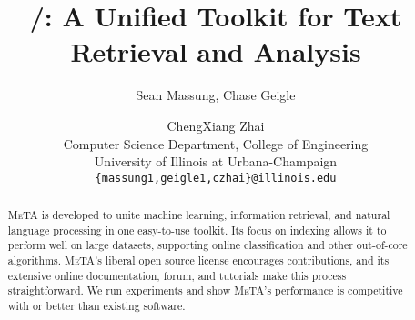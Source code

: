 \documentclass[11pt]{article}
\title{\meta/: A Unified Toolkit for Text Retrieval and Analysis}
\author{Sean Massung, Chase Geigle \and ChengXiang Zhai \\
            Computer Science Department, College of Engineering \\
            University of Illinois at Urbana-Champaign \\
            {\tt \{massung1,geigle1,czhai\}@illinois.edu}
}
\date{}
\def\meta/{\textsc{MeTA}}
\begin{document}
\maketitle

\begin{abstract}
\meta/ is developed to unite machine learning, information retrieval, and
natural language processing in one easy-to-use toolkit. Its focus on
indexing allows it to perform well on large datasets, supporting online
classification and other out-of-core algorithms. \meta/'s liberal open
source license encourages contributions, and its extensive online
documentation, forum, and tutorials make this process straightforward. We
run experiments and show \meta/'s performance is competitive with or better
than existing software.
\end{abstract}








\end{document}
